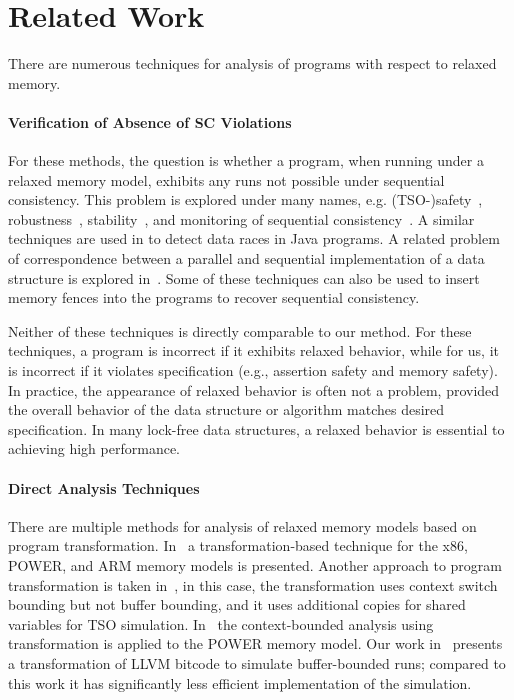 
\section{Related Work} \label{sec:related}

There are numerous techniques for analysis of programs with respect to relaxed memory.

\paragraph{Verification of Absence of SC Violations}

For these methods, the question is whether a program, when running under a relaxed memory model, exhibits any runs not possible under sequential consistency.
This problem is explored under many names, e.g. (TSO-)safety~\cite{Burckhardt2008}, robustness~\cite{Bouajjani2013,Derevenetc2014}, stability~\cite{Alglave2011}, and monitoring of sequential consistency~\cite{Burnim2011}.
A similar techniques are used in \cite{Yang2004} to detect data races in Java programs.
A related problem of correspondence between a parallel and sequential implementation of a data structure is explored in~\cite{Ou2017}.
Some of these techniques can also be used to insert memory fences into the programs to recover sequential consistency.

Neither of these techniques is directly comparable to our method.
For these techniques, a program is incorrect if it exhibits relaxed behavior, while for us, it is incorrect if it violates specification (e.g., assertion safety and memory safety).
In practice, the appearance of relaxed behavior is often not a problem, provided the overall behavior of the data structure or algorithm matches desired specification.
In many lock-free data structures, a relaxed behavior is essential to achieving high performance.

\paragraph{Direct Analysis Techniques}

There are multiple methods for analysis of relaxed memory models based on program transformation.
In~\cite{Alglave2013} a transformation-based technique for the x86, POWER, and ARM memory models is presented.
Another approach to program transformation is taken in~\cite{Atig2011}, in this case, the transformation uses context switch bounding but not buffer bounding, and it uses additional copies for shared variables for TSO simulation.
In~\cite{Abdulla2017} the context-bounded analysis using transformation is applied to the POWER memory model.
Our work in~\cite{SRB15weakmem} presents a transformation of LLVM bitcode to simulate buffer-bounded \xtso runs; compared to this work it has significantly less efficient implementation of the \xtso simulation.

